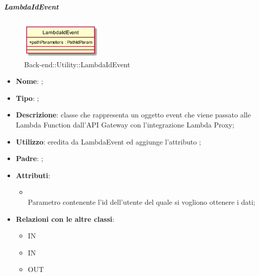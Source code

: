 \hypertarget{LambdaIdEvent_label}{\subparagraph{LambdaIdEvent}}
\begin{figure}[h]
	\centering
	\includegraphics[width=0.35\textwidth,height=\textheight,keepaspectratio]{images/ClassLambdaIdEvent.png}
	\caption{Back-end::Utility::LambdaIdEvent}
\end{figure}
\begin{itemize}
	\item \textbf{Nome}: ;
	\item \textbf{Tipo}: ;
	\item \textbf{Descrizione}: classe che rappresenta un oggetto event che viene passato alle Lambda Function dall'API Gateway con l'integrazione Lambda Proxy;
	\item \textbf{Utilizzo}: eredita da LambdaEvent ed aggiunge l'attributo ;
	\item \textbf{Padre}: ;
	\item \textbf{Attributi}:
	\begin{itemize}
		\item[]  \\
		Parametro contenente l'id dell'utente del quale si vogliono ottenere i dati;
	\end{itemize}
	\item \textbf{Relazioni con le altre classi}:
	\begin{itemize}
		\item IN \hyperlink{RulesService_label}{}
		\item IN \hyperlink{UsersService_label}{}
		\item OUT \hyperlink{PathIdParam_label}{}
	\end{itemize}
\end{itemize}
\FloatBarrier

